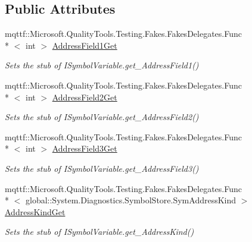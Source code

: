 \subsection*{Public Attributes}
\begin{DoxyCompactItemize}
\item 
mqttf\-::\-Microsoft.\-Quality\-Tools.\-Testing.\-Fakes.\-Fakes\-Delegates.\-Func\\*
$<$ int $>$ \hyperlink{class_system_1_1_diagnostics_1_1_symbol_store_1_1_fakes_1_1_stub_i_symbol_variable_a4a9f3f04bfc0db5c184a879330c77a98}{Address\-Field1\-Get}
\begin{DoxyCompactList}\small\item\em Sets the stub of I\-Symbol\-Variable.\-get\-\_\-\-Address\-Field1()\end{DoxyCompactList}\item 
mqttf\-::\-Microsoft.\-Quality\-Tools.\-Testing.\-Fakes.\-Fakes\-Delegates.\-Func\\*
$<$ int $>$ \hyperlink{class_system_1_1_diagnostics_1_1_symbol_store_1_1_fakes_1_1_stub_i_symbol_variable_ab391d878ffdcc3be409241e42ae36531}{Address\-Field2\-Get}
\begin{DoxyCompactList}\small\item\em Sets the stub of I\-Symbol\-Variable.\-get\-\_\-\-Address\-Field2()\end{DoxyCompactList}\item 
mqttf\-::\-Microsoft.\-Quality\-Tools.\-Testing.\-Fakes.\-Fakes\-Delegates.\-Func\\*
$<$ int $>$ \hyperlink{class_system_1_1_diagnostics_1_1_symbol_store_1_1_fakes_1_1_stub_i_symbol_variable_aecd98f918820b84bcb7765e32354da8e}{Address\-Field3\-Get}
\begin{DoxyCompactList}\small\item\em Sets the stub of I\-Symbol\-Variable.\-get\-\_\-\-Address\-Field3()\end{DoxyCompactList}\item 
mqttf\-::\-Microsoft.\-Quality\-Tools.\-Testing.\-Fakes.\-Fakes\-Delegates.\-Func\\*
$<$ global\-::\-System.\-Diagnostics.\-Symbol\-Store.\-Sym\-Address\-Kind $>$ \hyperlink{class_system_1_1_diagnostics_1_1_symbol_store_1_1_fakes_1_1_stub_i_symbol_variable_ad0ff09452c6222a0abbe267b84b1f1ed}{Address\-Kind\-Get}
\begin{DoxyCompactList}\small\item\em Sets the stub of I\-Symbol\-Variable.\-get\-\_\-\-Address\-Kind()\end{DoxyCompactList}\item 

\end{DoxyCompactItemize}
